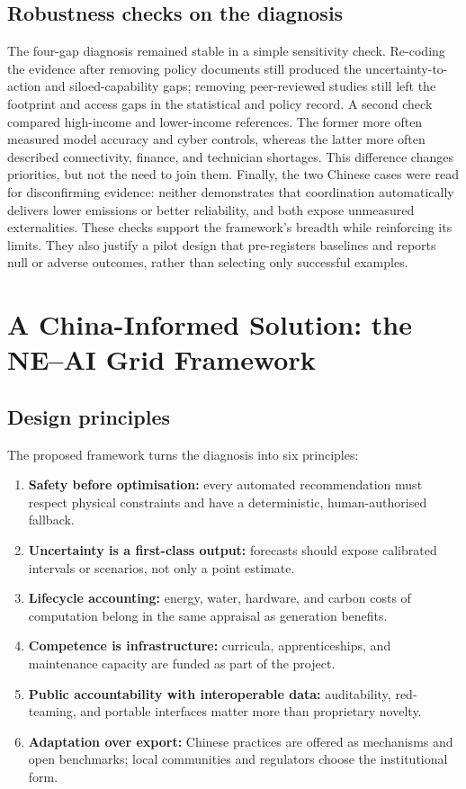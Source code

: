 \documentclass[12pt]{article}
\begin{document}
\subsection{Robustness checks on the diagnosis}
The four-gap diagnosis remained stable in a simple sensitivity check. Re-coding the evidence after removing policy documents still produced the uncertainty-to-action and siloed-capability gaps; removing peer-reviewed studies still left the footprint and access gaps in the statistical and policy record. A second check compared high-income and lower-income references. The former more often measured model accuracy and cyber controls, whereas the latter more often described connectivity, finance, and technician shortages. This difference changes priorities, but not the need to join them. Finally, the two Chinese cases were read for disconfirming evidence: neither demonstrates that coordination automatically delivers lower emissions or better reliability, and both expose unmeasured externalities. These checks support the framework's breadth while reinforcing its limits. They also justify a pilot design that pre-registers baselines and reports null or adverse outcomes, rather than selecting only successful examples.

\section{A China-Informed Solution: the NE--AI Grid Framework}

\subsection{Design principles}
The proposed framework turns the diagnosis into six principles:

\begin{enumerate}
  \item \textbf{Safety before optimisation:} every automated recommendation must respect physical constraints and have a deterministic, human-authorised fallback.
  \item \textbf{Uncertainty is a first-class output:} forecasts should expose calibrated intervals or scenarios, not only a point estimate.
  \item \textbf{Lifecycle accounting:} energy, water, hardware, and carbon costs of computation belong in the same appraisal as generation benefits.
  \item \textbf{Competence is infrastructure:} curricula, apprenticeships, and maintenance capacity are funded as part of the project.
  \item \textbf{Public accountability with interoperable data:} auditability, red-teaming, and portable interfaces matter more than proprietary novelty.
  \item \textbf{Adaptation over export:} Chinese practices are offered as mechanisms and open benchmarks; local communities and regulators choose the institutional form.
\end{enumerate}
\end{document}
